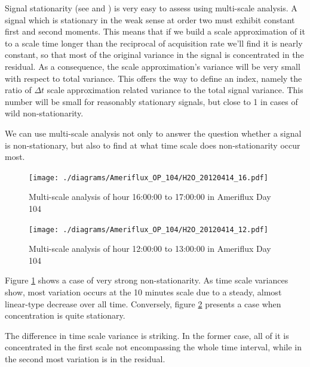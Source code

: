 \documentclass[a4paper,10pt]{book}
\begin{document}
Signal stationarity (see \cite{Klebaner2005} and \cite{Chorin2006}) is very easy to assess using multi-scale analysis. A signal which is stationary in the weak sense at order two must exhibit constant first and second moments. This means that if we build a scale approximation of it to a scale time longer than the reciprocal of acquisition rate we'll find it is nearly constant, so that most of the original variance in the signal is concentrated in the residual. As a consequence, the scale approximation's variance will be very small with respect to total variance. This offers the way to define an index, namely the ratio of $\Delta t$ scale approximation related variance to the total signal variance. This number will be small for reasonably stationary signals, but close to 1 in cases of wild non-stationarity.

We can use multi-scale analysis not only to answer the question whether a signal is non-stationary, but also to find at what time scale does non-stationarity occur most.

\begin{figure}[htp]
 \centering
 \begin{center}
 \texttt{[image: ./diagrams/Ameriflux\_OP\_104/H2O\_20120414\_16.pdf]}
 \end{center}
 \caption{Multi-scale analysis of hour 16:00:00 to 17:00:00 in Ameriflux Day 104}
 \label{fig:Ame.104.Hour16}
\end{figure}

\begin{figure}[htp]
 \centering
 \begin{center}
 \texttt{[image: ./diagrams/Ameriflux\_OP\_104/H2O\_20120414\_12.pdf]}
 \end{center}
 \caption{Multi-scale analysis of hour 12:00:00 to 13:00:00 in Ameriflux Day 104}
 \label{fig:Ame.104.Hour12}
\end{figure}


Figure \ref{fig:Ame.104.Hour16} shows a case of very strong non-stationarity. As time scale variances show, most variation occurs at the 10 minutes scale due to a steady, almost linear-type decrease over all time. Conversely, figure \ref{fig:Ame.104.Hour12} presents a case when concentration is quite stationary.

The difference in time scale variance is striking. In the former case, all of it is concentrated in the first scale not encompassing the whole time interval, while in the second most variation is in the residual.
\end{document}
